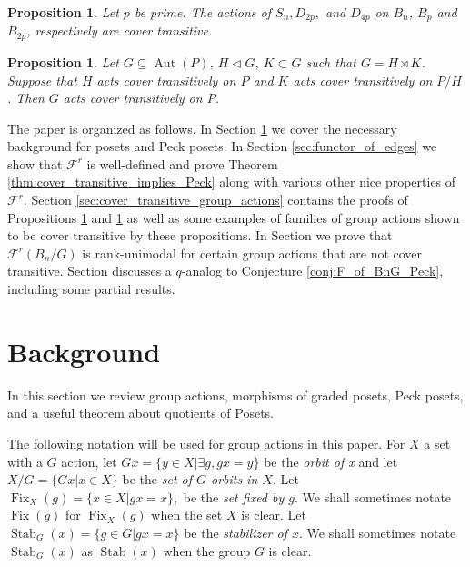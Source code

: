 \documentclass{amsart}
\newtheorem{prop}[thm]{Proposition}
\theoremstyle{remark}
\def\Stab{\operatorname{Stab}}
\def\Fix{\operatorname{Fix}}
\begin{document}
\begin{prop}\label{prop:cover_transitive_building_blocks}
Let $p$ be prime.  The actions of $S_n, D_{2p},$ and $D_{4p}$ on $B_n$, $B_p$ and $B_{2p}$, respectively are cover transitive.
\end{prop}

\begin{prop}\label{prop:semidirect_product_cover_transitive_actions}
Let $G\subseteq \operatorname{Aut}(P)$, $H\triangleleft G$, $K\subset G$ such that $G = H\rtimes K$.  Suppose that $H$ acts cover transitively on $P$ and $K$ acts cover transitively on $P/H$.  Then $G$ acts cover transitively on $P$.
\end{prop}


The paper is organized as follows.  In Section \ref{sec:background} we cover the necessary background for posets and Peck posets.  In Section \ref{sec:functor_of_edges} we show that $\mathcal{F}^r$ is well-defined and prove Theorem \ref{thm:cover_transitive_implies_Peck} along with various other nice properties of $\mathcal{F}^r$.  Section \ref{sec:cover_transitive_group_actions} contains the proofs of Propositions \ref{prop:cover_transitive_building_blocks} and \ref{prop:semidirect_product_cover_transitive_actions} as well as some examples of families of group actions shown to be cover transitive by these propositions.  In Section  we prove that $\mathcal{F}^r(B_n/G)$ is rank-unimodal for certain group actions that are not cover transitive.  Section  discusses a $q$-analog to Conjecture \ref{conj:F_of_BnG_Peck}, including some partial results.



\section{Background}\label{sec:background}
In this section we review group actions, morphisms of graded posets, Peck posets, and a useful theorem about quotients of Posets. 

The following notation will be used for group actions in this paper.
For $X$ a set with a $G$ action, let $Gx =\{y \in X|\exists g,gx =y\}$ be the {\it orbit of x} and let $X/G = \{Gx|x \in X\}$ be the {\it set of $G$ orbits in $X$}. Let $\Fix_X(g) = \{x \in X | gx = x\},$ be the {\it set fixed by $g.$} We shall sometimes notate $\Fix(g)$ for $\Fix_X(g)$ when the set $X$ is clear. Let $\Stab_G(x) = \{g \in G|gx = x\}$ be the {\it stabilizer of $x.$} We shall sometimes notate $\Stab_G(x)$ as $\Stab(x)$ when the group $G$ is clear.
\end{document}
